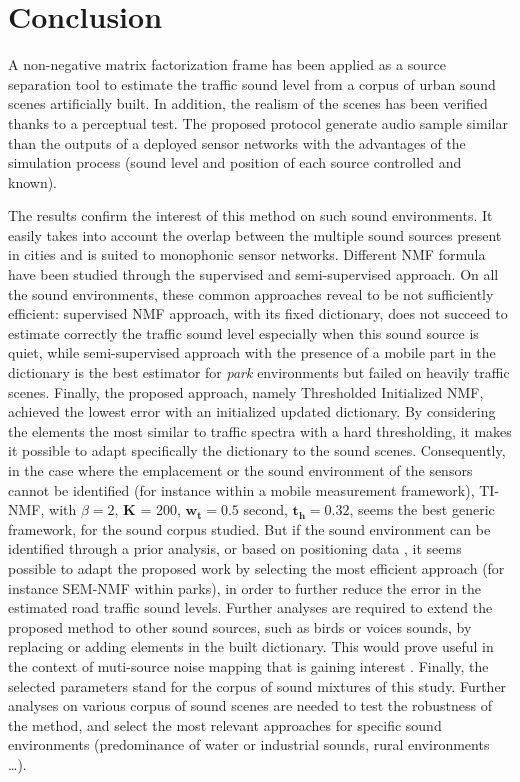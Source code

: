 \documentclass[review,5p,twocolumn,sort&compress,times]{elsarticle}
\begin{document}
\section{Conclusion}

A non-negative matrix factorization frame has been applied as a source separation tool to estimate the traffic sound level  from a corpus of urban sound scenes artificially built. In addition, the realism of the scenes has been verified thanks to a perceptual test. The proposed protocol generate audio sample similar than the outputs of a deployed sensor networks with the advantages of the simulation process (sound level and position of each source controlled and known).

The results confirm the interest of this method on such sound environments. It easily takes into account the overlap between the multiple sound sources present in cities and is suited to monophonic sensor networks. Different NMF formula have been studied through the supervised and semi-supervised approach. On all the sound environments, these common approaches reveal to be not sufficiently efficient: supervised NMF approach, with its fixed dictionary, does not succeed to estimate correctly the traffic sound level especially when this sound source is quiet, while semi-supervised approach with the presence of a mobile part in the dictionary is the best estimator for \textit{park} environments but failed on heavily traffic scenes. Finally, the proposed approach, namely Thresholded Initialized NMF, achieved the lowest error with an initialized updated dictionary. By considering the elements the most similar to traffic spectra with a hard thresholding, it makes it possible to adapt specifically the dictionary to the sound scenes. Consequently, in the case where the emplacement or the sound environment of the sensors cannot be identified (for instance within a mobile measurement framework), TI-NMF, with $\beta = 2$, $\mathbf{K}$ = 200, $\mathbf{w_t} = 0.5$ second, $\mathbf{t_{h}} = 0.32$, seems the best generic framework, for the sound corpus studied. But if the sound environment can be identified through a prior analysis, or based on positioning data \cite{can2015noise,lavandier2016urban}, it seems possible to adapt the proposed work by selecting the most efficient approach (for instance SEM-NMF within parks), in order to further reduce the error in the estimated road traffic sound levels.
Further analyses are required to extend the proposed method to other sound sources, such as birds or voices sounds, by replacing or adding elements in the built dictionary. This would prove useful in the context of muti-source noise mapping that is  gaining interest \cite{aumond2017Probabilistic, aletta2015soundscape}. Finally, the selected parameters stand for the corpus of sound mixtures of this study. Further analyses on various corpus of sound scenes are needed to test the robustness of the method, and select the most relevant approaches for specific sound environments (predominance of water or industrial sounds, rural environments \dots).
\end{document}

